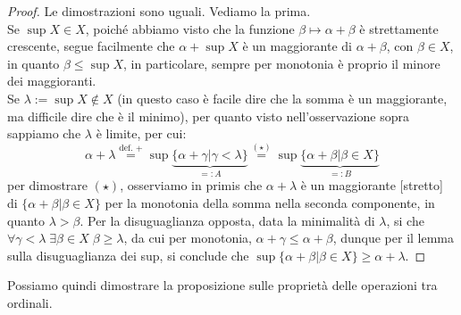 \begin{proof}
	Le dimostrazioni sono uguali. Vediamo la prima.\\
	Se $\sup X \in X$, poiché abbiamo visto che la funzione $\beta \mapsto \alpha + \beta$ è strettamente crescente, segue facilmente che $\alpha + \sup X$ è un maggiorante di $\alpha + \beta$, con $\beta \in X$, in quanto $\beta \leq \sup X$, in particolare, sempre per monotonia è proprio il minore dei maggioranti.\\
	Se $\lambda := \sup X \not \in X$ (in questo caso è facile dire che la somma è un maggiorante, ma difficile dire che è il minimo), per quanto visto nell'osservazione sopra sappiamo che $\lambda$ è limite, per cui:
	\[ \alpha + \lambda \overset{\text{def. +}}{=} \sup\underbrace{\{\alpha + \gamma | \gamma < \lambda\}}_{=:A} \overset{(\star)}{=} \sup\underbrace{\{\alpha + \beta | \beta \in X\}}_{=:B}
		\]
	per dimostrare $(\star)$, osserviamo in primis che $\alpha + \lambda$ è un maggiorante [stretto] di $\{\alpha + \beta | \beta \in X\}$ per la monotonia della somma nella seconda componente, in quanto $\lambda > \beta$.
	Per la disuguaglianza opposta, data la minimalità di $\lambda$, si che $\forall \gamma < \lambda \; \exists \beta \in X \; \beta \geq \lambda$, da cui per monotonia, $\alpha + \gamma \leq \alpha + \beta$, dunque per il lemma sulla disuguaglianza dei sup, si conclude che $\sup\{\alpha + \beta | \beta \in X\} \geq \alpha + \lambda$.
\end{proof}

Possiamo quindi dimostrare la proposizione sulle proprietà delle operazioni tra ordinali.

